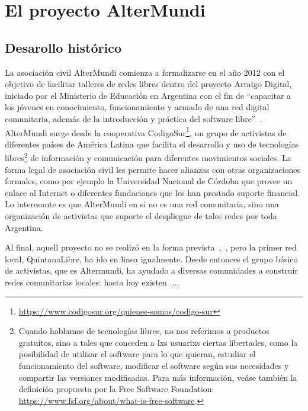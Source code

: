 \section{El proyecto AlterMundi}

\subsection{Desarollo histórico}

La asociación civil AlterMundi comienza a formalizarse en el año 2012 con el objetivo de facilitar talleres de redes libres dentro del proyecto Arraigo Digital, iniciado por el Ministerio de Educación en Argentina con el fin de ``capacitar a los jóvenes en conocimiento, funcionamiento y armado de una red digital comunitaria, además de la introducción y práctica del software libre''~\autocite{Picolli2015}.
AlterMundi surge desde la cooperativa CodigoSur\footnote{\url{https://www.codigosur.org/quienes-somos/codigo-sur}}, un grupo de activistas de diferentes países de América Latina que facilita el desarrollo y uso de tecnologías libres\footnote{Cuando
 hablamos de tecnologías libres, no nos referimos a productos gratuitos, sino a tales que conceden a lxs usuarixs ciertas libertades, como la posibilidad de utilizar el software para lo que quieran, estudiar el funcionamiento del software, modificar el software según sus necesidades y compartir las versiones modificadas.
Para más información, veáse también la definición propuesta por la Free Software Foundation: \url{https://www.fsf.org/about/what-is-free-software}.}
de información y comunicación para diferentes movimientos sociales.
La forma legal de asociación civil les permite hacer alianzas con otras organizaciones formales, como por ejemplo la Universidad Nacional de Córdoba que provee un enlace al Internet o diferentes fundaciones que les han prestado suporte financial.
Lo interesante es que AlterMundi en si no es una red comunitaria, sino una organización de activistas que suporte el despliegue de tales redes por toda Argentina.


Al final, aquell proyecto no se realizó en la forma prevista~\autocite{Vaseva2016a},~\autocite{iv-nico-pillku}, pero la primer red local, QuintanaLibre, ha ido en linea igualmente.
Desde entonces el grupo básico de activistas, que es Altermundi, ha ayudado a diversas comunidades a construir redes comunitarias locales:
hasta hoy existen ....

